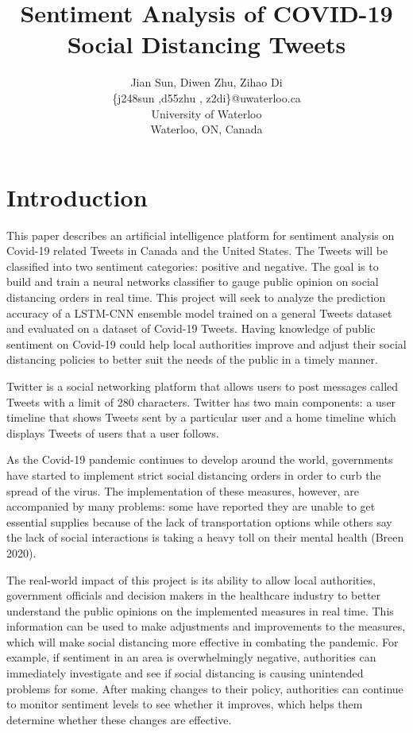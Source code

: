 \documentclass[letterpaper]{article} %
\begin{document}
%
\title{Sentiment Analysis of COVID-19 Social Distancing Tweets}
\author{Jian Sun, Diwen Zhu, Zihao Di\\
\{j248sun ,d55zhu , z2di\}@uwaterloo.ca\\
University of Waterloo\\
Waterloo, ON, Canada\\
}
\maketitle



\section{Introduction}

This paper describes an artificial intelligence platform for sentiment analysis on Covid-19 related Tweets in Canada and the United States. The Tweets will be classified into two sentiment categories: positive and negative. The goal is to build and train a neural networks classifier to gauge public opinion on social distancing orders in real time. This project will seek to analyze the prediction accuracy of a LSTM-CNN ensemble model trained on a general Tweets dataset and evaluated on a dataset of Covid-19 Tweets. Having knowledge of public sentiment on Covid-19 could help local authorities improve and adjust their social distancing policies to better suit the needs of the public in a timely manner.

Twitter is a social networking platform that allows users to post messages called Tweets with a limit of 280 characters. Twitter has two main components: a user timeline that shows Tweets sent by a particular user and a home timeline which displays Tweets of users that a user follows.

As the Covid-19 pandemic continues to develop around the world, governments have started to implement strict social distancing orders in order to curb the spread of the virus. The implementation of these measures, however, are accompanied by many problems: some have reported they are unable to get essential supplies because of the lack of transportation options while others say the lack of social interactions is taking a heavy toll on their mental health (Breen 2020).

The real-world impact of this project is its ability to allow local authorities, government officials and decision makers in the healthcare industry to better understand the public opinions on the implemented measures in real time. This information can be used to make adjustments and improvements to the measures, which will make social distancing more effective in combating the pandemic. For example, if sentiment in an area is overwhelmingly negative, authorities can immediately investigate and see if social distancing is causing unintended problems for some. After making changes to their policy, authorities can continue to monitor sentiment levels to see whether it improves, which helps them determine whether these changes are effective.
\end{document}
